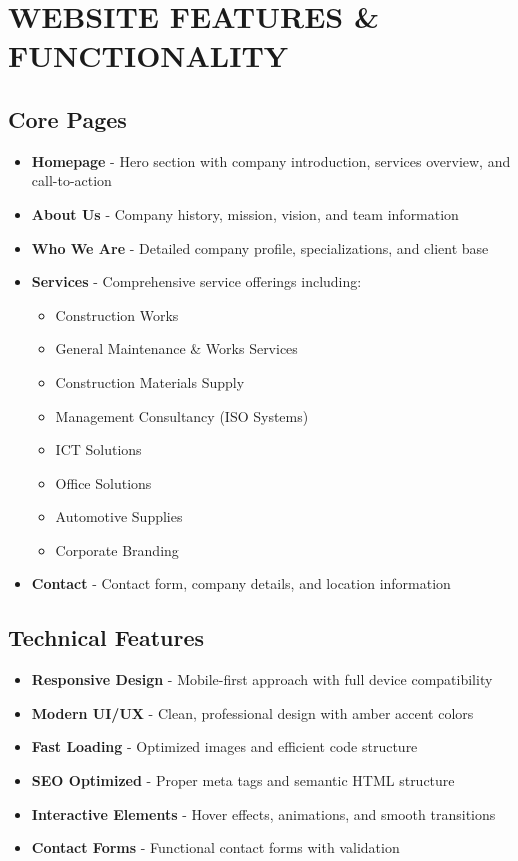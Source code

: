 \documentclass[11pt,a4paper]{article}
\begin{document}
\vspace{1cm}

\section*{\color{primaryBlue}WEBSITE FEATURES \& FUNCTIONALITY}

\subsection*{Core Pages}
\begin{itemize}[leftmargin=2cm]
    \item \textbf{Homepage} - Hero section with company introduction, services overview, and call-to-action
    \item \textbf{About Us} - Company history, mission, vision, and team information
    \item \textbf{Who We Are} - Detailed company profile, specializations, and client base
    \item \textbf{Services} - Comprehensive service offerings including:
    \begin{itemize}
        \item Construction Works
        \item General Maintenance \& Works Services
        \item Construction Materials Supply
        \item Management Consultancy (ISO Systems)
        \item ICT Solutions
        \item Office Solutions
        \item Automotive Supplies
        \item Corporate Branding
    \end{itemize}
    \item \textbf{Contact} - Contact form, company details, and location information
\end{itemize}

\subsection*{Technical Features}
\begin{itemize}[leftmargin=2cm]
    \item \textbf{Responsive Design} - Mobile-first approach with full device compatibility
    \item \textbf{Modern UI/UX} - Clean, professional design with amber accent colors
    \item \textbf{Fast Loading} - Optimized images and efficient code structure
    \item \textbf{SEO Optimized} - Proper meta tags and semantic HTML structure
    \item \textbf{Interactive Elements} - Hover effects, animations, and smooth transitions
    \item \textbf{Contact Forms} - Functional contact forms with validation
\end{itemize}
\end{document}
